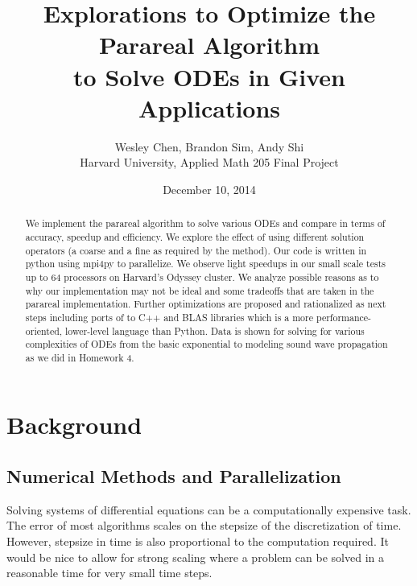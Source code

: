 \documentclass[letterpaper,12pt]{article}
\begin{document}
\title{Explorations to Optimize the Parareal Algorithm \\to Solve ODEs in Given Applications}
\author{Wesley Chen, Brandon Sim, Andy Shi \\
Harvard University, Applied Math 205 Final Project}
\date{December 10, 2014}

\setlength\parindent{0pt}

\setlength\parskip{2ex}

\maketitle
\begin{abstract}
We implement the parareal algorithm to solve various ODEs and compare in
terms of accuracy, speedup and efficiency. We explore the effect of using
different solution operators (a coarse and a fine as required by the method).
Our code is written in python using mpi4py to parallelize. We observe
light speedups in our small scale tests up to 64 processors on Harvard's
Odyssey cluster. We analyze possible reasons as to why our implementation
may not be ideal and some tradeoffs that are taken in the parareal
implementation. Further optimizations are proposed and rationalized as next
steps including ports of to C++ and BLAS libraries which is a more
performance-oriented, lower-level language than Python. Data is shown for
solving for various complexities of ODEs from the basic exponential to
modeling sound wave propagation as we did in Homework 4.
\end{abstract}

\clearpage

\tableofcontents

\clearpage

\section{Background}

\subsection{Numerical Methods and Parallelization}
Solving systems of differential equations can be a computationally expensive
task. The error of most algorithms scales on the stepsize of the discretization
of time. However, stepsize in time is also proportional to the computation
required. It would be nice to allow for strong scaling where a problem can be
solved in a reasonable time for very small time steps.
\end{document}
